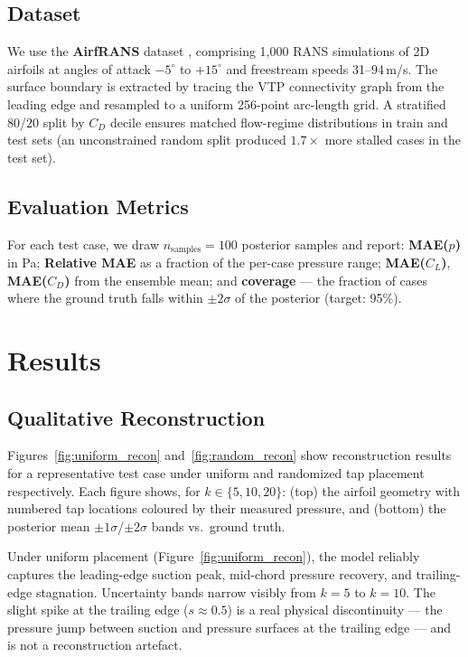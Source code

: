 \documentclass[12pt]{article}
\begin{document}
\subsection{Dataset}

We use the \textbf{AirfRANS} dataset \citep{bonnet2022airfrans}, comprising
1,000 RANS simulations of 2D airfoils at angles of attack $-5^\circ$ to
$+15^\circ$ and freestream speeds 31--94\,m/s. The surface boundary is extracted
by tracing the VTP connectivity graph from the leading edge and resampled to a
uniform 256-point arc-length grid. A stratified 80/20 split by $C_D$ decile
ensures matched flow-regime distributions in train and test sets (an unconstrained
random split produced $1.7\times$ more stalled cases in the test set).

\subsection{Evaluation Metrics}

For each test case, we draw $n_\mathrm{samples}=100$ posterior samples and report:
\textbf{MAE($p$)} in Pa; \textbf{Relative MAE} as a fraction of the per-case
pressure range; \textbf{MAE($C_L$)}, \textbf{MAE($C_D$)} from the ensemble mean;
and \textbf{coverage} — the fraction of cases where the ground truth falls within
$\pm2\sigma$ of the posterior (target: 95\%).

\section{Results}
\label{sec:results}

\subsection{Qualitative Reconstruction}

Figures~\ref{fig:uniform_recon} and~\ref{fig:random_recon} show reconstruction
results for a representative test case under uniform and randomized tap placement
respectively. Each figure shows, for $k \in \{5, 10, 20\}$: (top) the airfoil
geometry with numbered tap locations coloured by their measured pressure, and
(bottom) the posterior mean $\pm1\sigma$/$\pm2\sigma$ bands vs.\ ground truth.

Under uniform placement (Figure~\ref{fig:uniform_recon}), the model reliably
captures the leading-edge suction peak, mid-chord pressure recovery, and
trailing-edge stagnation. Uncertainty bands narrow visibly from $k=5$ to $k=10$.
The slight spike at the trailing edge ($s \approx 0.5$) is a real physical
discontinuity — the pressure jump between suction and pressure surfaces at the
trailing edge — and is not a reconstruction artefact.
\end{document}
